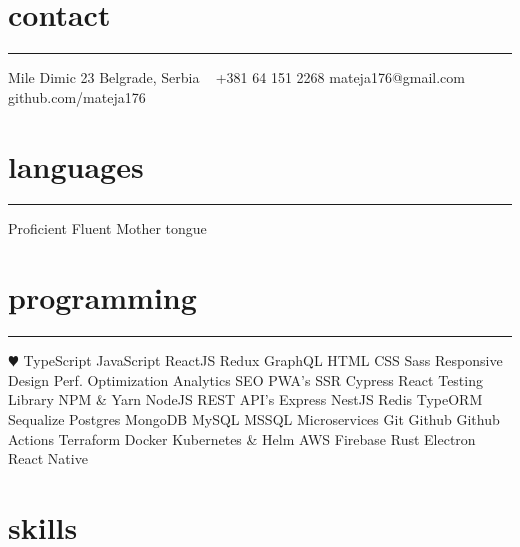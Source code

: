 \documentclass[]{cv-style}          %
\begin{document}


\begin{aside}
  \section{contact}
  \color{gray} \rule{\textwidth}{0.1mm}
  Mile Dimic 23
  Belgrade, Serbia
  ~
  +381 64 151 2268
  mateja176@gmail.com
    {\subtitlefont github.com/mateja176}
  \section{languages}
  \rule{\textwidth}{0.1mm}
  \space\space\space\space\space\space\space\space\space\space\space\space Proficient
  \space\space\space\space\space\space\space\space\space\space\space\space\space\space\space\space\space\space Fluent
  \space\space Mother tongue
  \section{programming}
  \rule{\textwidth}{0.1mm}
  {\color{blue} $\varheartsuit$} TypeScript
  JavaScript
  ReactJS
  Redux
  GraphQL
  HTML
  CSS
  Sass
  Responsive Design
  Perf. Optimization
  Analytics
  SEO
  PWA's
  SSR
  Cypress
  React Testing Library
  NPM \& Yarn
  NodeJS
  REST API's
  Express
  NestJS
  Redis
  TypeORM
  Sequalize
  Postgres
  MongoDB
  MySQL
  MSSQL
  Microservices
  Git
  Github
  Github Actions
  Terraform
  Docker
  Kubernetes \& Helm
  AWS
  Firebase
  Rust
  Electron
  React Native
\end{aside}


\section{skills}
\vspace{-0.2cm}
\end{document}

